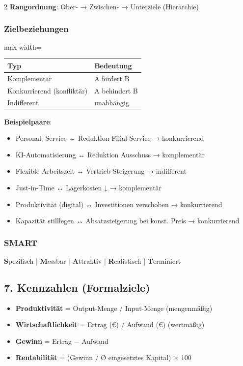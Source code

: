 \documentclass[10pt, a4paper]{article}
\begin{document}
\begin{multicols}{2}
\textbf{Rangordnung}: Ober- → Zwischen- → Unterziele (Hierarchie)



\subsubsection{Zielbeziehungen}


{\small
\begin{adjustbox}{max width=\linewidth}
{\scriptsize
\begin{tabular}{ll}
\toprule
\textbf{Typ} & \textbf{Bedeutung} \\
\midrule
Komplementär & A fördert B \\
Konkurrierend (konfliktär) & A behindert B \\
Indifferent & unabhängig \\
\bottomrule
\end{tabular}
}
\end{adjustbox}
}


\textbf{Beispielpaare}:

\begin{itemize}
  \item Personal. Service ↔ Reduktion Filial-Service → konkurrierend
  \item KI-Automatisierung ↔ Reduktion Ausschuss → komplementär
  \item Flexible Arbeitszeit ↔ Vertrieb-Steigerung → indifferent
  \item Just-in-Time ↔ Lagerkosten ↓ → komplementär
  \item Produktivität (digital) ↔ Investitionen verschoben → konkurrierend
  \item Kapazität stilllegen ↔ Absatzsteigerung bei konst. Preis → konkurrierend
\end{itemize}


\subsubsection{SMART}
\textbf{S}pezifisch | \textbf{M}essbar | \textbf{A}ttraktiv | \textbf{R}ealistisch | \textbf{T}erminiert



\subsection{7. Kennzahlen (Formalziele)}

\begin{itemize}
  \item \textbf{Produktivität} = Output-Menge / Input-Menge (mengenmäßig)
  \item \textbf{Wirtschaftlichkeit} = Ertrag (€) / Aufwand (€) (wertmäßig)
  \item \textbf{Gewinn} = Ertrag − Aufwand
  \item \textbf{Rentabilität} = (Gewinn / Ø eingesetztes Kapital) × 100
\end{itemize}



\end{multicols}
\end{document}
